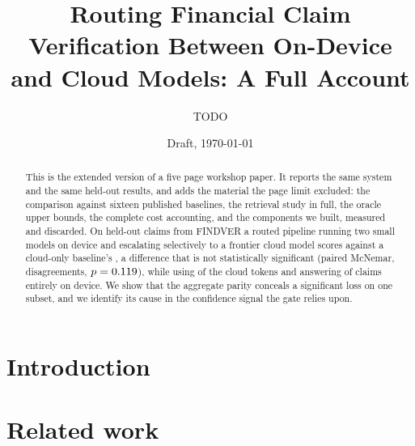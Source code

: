 \documentclass[11pt]{article}
\title{Routing Financial Claim Verification Between On-Device and Cloud Models:
       A Full Account}
\author{TODO}
\date{Draft, \today}
\begin{document}
\maketitle

\begin{abstract}
This is the extended version of a five page workshop paper. It reports the same system and
the same held-out results, and adds the material the page limit excluded: the comparison
against sixteen published baselines, the retrieval study in full, the oracle upper bounds,
the complete cost accounting, and the components we built, measured and discarded. On
\nTest{} held-out claims from FINDVER a routed pipeline running two small models on device
and escalating selectively to a frontier cloud model scores \accRouted{} against a
cloud-only baseline's \accCloud{}, a difference that is not statistically significant
(paired McNemar, \mcnemarAllDisagree{} disagreements, $p = 0.119{}$), while using
\costRatio{} of the cloud tokens and answering \onDeviceRate{} of claims entirely on
device. We show that the aggregate parity conceals a significant loss on one subset, and
we identify its cause in the confidence signal the gate relies upon.
\end{abstract}

\tableofcontents

\section{Introduction}
\label{sec:long-intro}


\section{Related work}
\label{sec:long-related}

%
\end{document}
